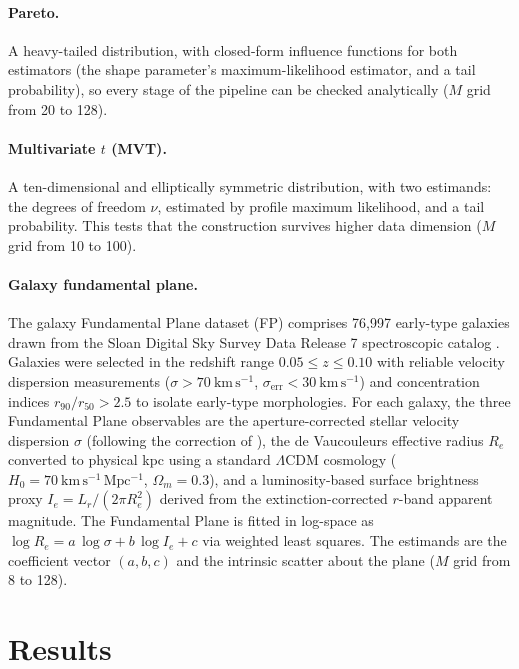 \documentclass[runningheads]{llncs}
\begin{document}
\paragraph{Pareto.} A heavy-tailed distribution, with closed-form influence functions for both estimators (the shape parameter's maximum-likelihood estimator, and a tail probability), so every stage of the pipeline can be checked analytically ($M$ grid from 20 to 128).

\paragraph{Multivariate $t$ (MVT).} A ten-dimensional and elliptically symmetric distribution, with two estimands: the degrees of freedom $\nu$, estimated by profile maximum likelihood, and a tail probability. This tests that the construction survives higher data dimension ($M$ grid from 10 to 100).

\paragraph{Galaxy fundamental plane.} The galaxy Fundamental Plane dataset (FP) comprises 76{,}997 early-type galaxies drawn from the Sloan Digital Sky Survey Data Release 7 spectroscopic catalog \cite{abazajian2009}. Galaxies were selected in the redshift range $0.05 \le z \le 0.10$ with reliable velocity dispersion measurements ($\sigma > 70~\mathrm{km\,s^{-1}}$, $\sigma_{\mathrm{err}} < 30~\mathrm{km\,s^{-1}}$) and concentration indices $r_{90}/r_{50} > 2.5$ to isolate early-type morphologies. For each galaxy, the three Fundamental Plane observables are the aperture-corrected stellar velocity dispersion $\sigma$ (following the correction of \cite{jorgensen1995}), the de Vaucouleurs effective radius $R_e$ converted to physical kpc using a standard $\Lambda$CDM cosmology ($H_0 = 70~\mathrm{km\,s^{-1}\,Mpc^{-1}}$, $\Omega_m = 0.3$), and a luminosity-based surface brightness proxy $I_e = L_r/(2\pi R_e^2)$ derived from the extinction-corrected $r$-band apparent magnitude. The Fundamental Plane is fitted in log-space as $\log R_e = a\,\log\sigma + b\,\log I_e + c$ via weighted least squares. The estimands are the coefficient vector $(a,b,c)$ and the intrinsic scatter about the plane ($M$ grid from 8 to 128).


\section{Results}\label{sec:results}
\end{document}

